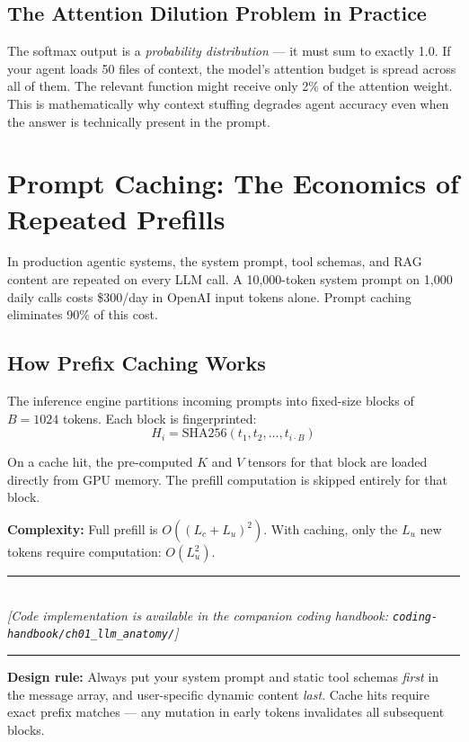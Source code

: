 \subsection{The Attention Dilution Problem in Practice}
The softmax output is a \textit{probability distribution} — it must sum to exactly 1.0. If your agent loads 50 files of context, the model's attention budget is spread across all of them. The relevant function might receive only 2\% of the attention weight. This is mathematically why context stuffing degrades agent accuracy even when the answer is technically present in the prompt.

\section{Prompt Caching: The Economics of Repeated Prefills}

In production agentic systems, the system prompt, tool schemas, and RAG content are repeated on every LLM call. A 10,000-token system prompt on 1,000 daily calls costs \$300/day in OpenAI input tokens alone. Prompt caching eliminates 90\% of this cost.

\subsection{How Prefix Caching Works}
The inference engine partitions incoming prompts into fixed-size blocks of $B=1024$ tokens. Each block is fingerprinted:
\begin{equation}
H_i = \text{SHA256}(t_1, t_2, \dots, t_{i \cdot B})
\end{equation}

On a cache hit, the pre-computed $K$ and $V$ tensors for that block are loaded directly from GPU memory. The prefill computation is skipped entirely for that block.

\textbf{Complexity:} Full prefill is $O\!\left((L_c + L_u)^2\right)$. With caching, only the $L_u$ new tokens require computation: $O\!\left(L_u^2\right)$.


\begin{center}
\noindent\rule{0.6\textwidth}{0.4pt} \\
\vspace{0.3em}
\textit{[Code implementation is available in the companion coding handbook: \texttt{coding-handbook/ch01\_llm\_anatomy/}]} \\
\noindent\rule{0.6\textwidth}{0.4pt}
\end{center}


\textbf{Design rule:} Always put your system prompt and static tool schemas \textit{first} in the message array, and user-specific dynamic content \textit{last}. Cache hits require exact prefix matches — any mutation in early tokens invalidates all subsequent blocks.
